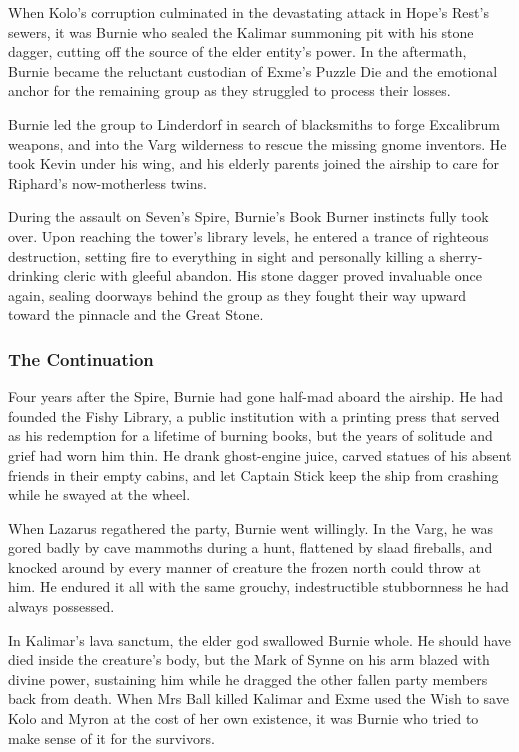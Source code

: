 When Kolo's corruption culminated in the devastating attack in Hope's Rest's sewers, it was Burnie who sealed the Kalimar summoning pit with his stone dagger, cutting off the source of the elder entity's power.  In the aftermath, Burnie became the reluctant custodian of Exme's Puzzle Die and the emotional anchor for the remaining group as they struggled to process their losses.

Burnie led the group to Linderdorf in search of blacksmiths to forge Excalibrum weapons, and into the Varg wilderness to rescue the missing gnome inventors.  He took Kevin under his wing, and his elderly parents joined the airship to care for Riphard's now-motherless twins.

During the assault on Seven's Spire, Burnie's Book Burner instincts fully took over.  Upon reaching the tower's library levels, he entered a trance of righteous destruction, setting fire to everything in sight and personally killing a sherry-drinking cleric with gleeful abandon.  His stone dagger proved invaluable once again, sealing doorways behind the group as they fought their way upward toward the pinnacle and the Great Stone.

\subsubsection{The Continuation}

Four years after the Spire, Burnie had gone half-mad aboard the airship.  He had founded the Fishy Library, a public institution with a printing press that served as his redemption for a lifetime of burning books, but the years of solitude and grief had worn him thin.  He drank ghost-engine juice, carved statues of his absent friends in their empty cabins, and let Captain Stick keep the ship from crashing while he swayed at the wheel.

When Lazarus regathered the party, Burnie went willingly.  In the Varg, he was gored badly by cave mammoths during a hunt, flattened by slaad fireballs, and knocked around by every manner of creature the frozen north could throw at him.  He endured it all with the same grouchy, indestructible stubbornness he had always possessed.

In Kalimar's lava sanctum, the elder god swallowed Burnie whole.  He should have died inside the creature's body, but the Mark of Synne on his arm blazed with divine power, sustaining him while he dragged the other fallen party members back from death.  When Mrs Ball killed Kalimar and Exme used the Wish to save Kolo and Myron at the cost of her own existence, it was Burnie who tried to make sense of it for the survivors.

